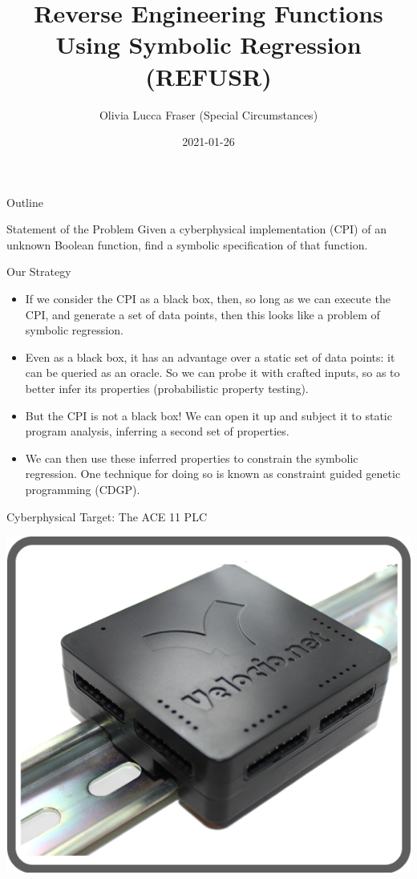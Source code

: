 \documentclass[presentation]{beamer}
\author{Olivia Lucca Fraser (Special Circumstances)}
\date{2021-01-26}
\title{Reverse Engineering Functions Using Symbolic Regression (REFUSR)}
\begin{document}
\maketitle
\begin{frame}{Outline}
\tableofcontents
\end{frame}



\begin{frame}[label={sec:org3fe3a30}]{Statement of the Problem}
Given a cyberphysical implementation (CPI) of an unknown Boolean function, find a symbolic specification of that function.
\end{frame}

\begin{frame}[label={sec:org2a353f0}]{Our Strategy}
\begin{itemize}
\item If we consider the CPI as a \alert{black box}, then, so long as we can execute the CPI, and generate a set of data points, then this looks like a problem of \alert{symbolic regression}.
\item Even as a black box, it has an advantage over a static set of data points: it can be queried as an oracle. So we can \alert{probe} it with crafted inputs, so as to better infer its properties (probabilistic property testing).
\item But the CPI is \alert{not} a black box! We can open it up and subject it to static program analysis, inferring a second set of properties.
\item We can then \alert{use these inferred properties to constrain the symbolic regression}. One technique for doing so is known as \alert{constraint guided genetic programming} (CDGP).
\end{itemize}
\end{frame}



\begin{frame}[label={sec:org7bf07df}]{Cyberphysical Target: The ACE 11 PLC}
\begin{center}
\includegraphics[width=.9\linewidth]{./img/Ace11.png}
\end{center}
\end{frame}
\end{document}

